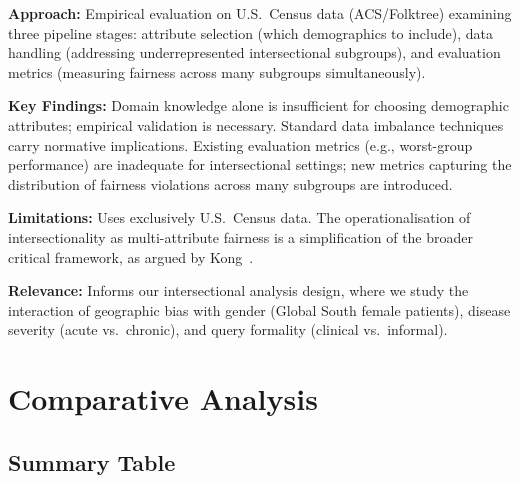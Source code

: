 \documentclass[12pt,a4paper]{article}
\begin{document}
\textbf{Approach:} Empirical evaluation on U.S.\ Census data (ACS/Folktree) examining three pipeline stages: attribute selection (which demographics to include), data handling (addressing underrepresented intersectional subgroups), and evaluation metrics (measuring fairness across many subgroups simultaneously).

\textbf{Key Findings:} Domain knowledge alone is insufficient for choosing demographic attributes; empirical validation is necessary. Standard data imbalance techniques carry normative implications. Existing evaluation metrics (e.g., worst-group performance) are inadequate for intersectional settings; new metrics capturing the distribution of fairness violations across many subgroups are introduced.

\textbf{Limitations:} Uses exclusively U.S.\ Census data. The operationalisation of intersectionality as multi-attribute fairness is a simplification of the broader critical framework, as argued by Kong~\cite{kong2022}.

\textbf{Relevance:} Informs our intersectional analysis design, where we study the interaction of geographic bias with gender (Global South female patients), disease severity (acute vs.\ chronic), and query formality (clinical vs.\ informal).


\section{Comparative Analysis}

\subsection{Summary Table}
\end{document}
